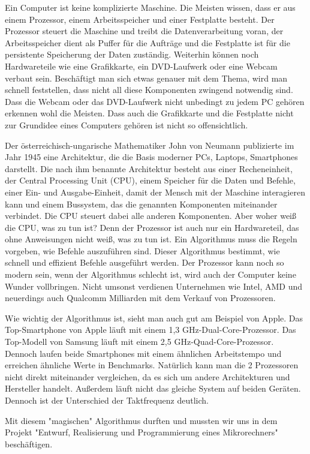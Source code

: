 Ein Computer ist keine komplizierte Maschine. Die Meisten wissen, dass er aus einem Prozessor, einem Arbeitsspeicher und einer Festplatte besteht. Der Prozessor steuert die Maschine und treibt die Datenverarbeitung voran, der Arbeitsspeicher dient als Puffer für die Aufträge und die Festplatte ist für die persistente Speicherung der Daten zuständig. Weiterhin können noch Hardwareteile wie eine Grafikkarte, ein DVD-Laufwerk oder eine Webcam verbaut sein.
Beschäftigt man sich etwas genauer mit dem Thema, wird man schnell feststellen, dass nicht all diese Komponenten zwingend notwendig sind. Dass die Webcam oder das DVD-Laufwerk nicht unbedingt zu jedem PC gehören erkennen wohl die Meisten. Dass auch die Grafikkarte und die Festplatte nicht zur Grundidee eines Computers gehören ist nicht so offensichtlich.

Der österreichisch-ungarische Mathematiker John von Neumann publizierte im Jahr 1945 eine Architektur, die die Basis moderner PCs, Laptops, Smartphones darstellt.
Die nach ihm benannte Architektur besteht aus einer Recheneinheit, der Central Processing Unit (CPU), einem Speicher für die Daten und Befehle, einer Ein- und Ausgabe-Einheit, damit der Mensch mit der Maschine interagieren kann und einem Bussystem, das die genannten Komponenten miteinander verbindet. Die CPU steuert dabei alle anderen Komponenten. Aber woher weiß die CPU, was zu tun ist? Denn der Prozessor ist auch nur ein Hardwareteil, das ohne Anweisungen nicht weiß, was zu tun ist. Ein Algorithmus muss die Regeln vorgeben, wie Befehle auszuführen sind. Dieser Algorithmus bestimmt, wie schnell und effizient Befehle ausgeführt werden. Der Prozessor kann noch so modern sein, wenn der Algorithmus schlecht ist, wird auch der Computer keine Wunder vollbringen. Nicht umsonst verdienen Unternehmen wie Intel, AMD und neuerdings auch Qualcomm Milliarden mit dem Verkauf von Prozessoren. 

Wie wichtig der Algorithmus ist, sieht man auch gut am Beispiel von Apple. Das Top-Smartphone von Apple läuft mit einem 1,3 GHz-Dual-Core-Prozessor. Das Top-Modell von Samsung läuft mit einem 2,5 GHz-Quad-Core-Prozessor. Dennoch laufen beide Smartphones mit einem ähnlichen Arbeitstempo und erreichen ähnliche Werte in Benchmarks. Natürlich kann man die 2 Prozessoren nicht direkt miteinander vergleichen, da es sich um andere Architekturen und Hersteller handelt. Außerdem läuft nicht das gleiche System auf beiden Geräten. Dennoch ist der Unterschied der Taktfrequenz deutlich.

Mit diesem "magischen" Algorithmus durften und mussten wir uns in dem Projekt "Entwurf, Realisierung und Programmierung eines Mikrorechners" beschäftigen. 



